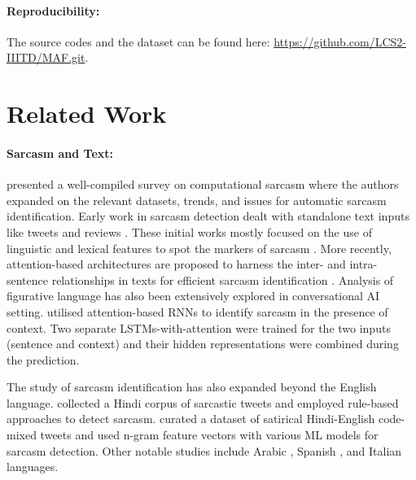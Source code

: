 \documentclass[11pt]{article}
\begin{document}
\paragraph{Reproducibility:} The source codes and the dataset can be found here: \href{https://github.com/LCS2-IIITD/MAF.git}{https://github.com/LCS2-IIITD/MAF.git}.

\section{Related Work}
\paragraph{Sarcasm and Text:}
\citet{1joshi2017automatic} presented a well-compiled survey on computational sarcasm where the authors expanded on the relevant datasets, trends, and issues for automatic sarcasm identification. Early work in sarcasm detection dealt with standalone text inputs like tweets and reviews \cite{kreuz-caucci:2007:sarcasm:lexical, tsur:sarcasm:2010, joshi:sarcsam:incongruity:2015, peled-reichart-2017-sarcasm}. These initial works mostly focused on the use of linguistic and lexical features to spot the markers of sarcasm \citep{kreuz-caucci:2007:sarcasm:lexical,tsur:sarcasm:2010}. 
More recently, attention-based architectures are  proposed to harness the inter- and intra-sentence relationships in texts for efficient sarcasm identification \citep{tay-etal-2018-reasoning, xiong2019sarcasm, srivastava-etal-2020-novel}. Analysis of figurative language has also been extensively explored in conversational AI setting. \citet{ghosh2017role} utilised attention-based RNNs to identify sarcasm in the presence of context. Two separate LSTMs-with-attention were trained for the two inputs (sentence and context) and their hidden representations were combined during the prediction.

The study of sarcasm identification has also expanded beyond the English language. \citet{bharti2017harnessing} collected a Hindi corpus of  sarcastic tweets and employed rule-based approaches to detect sarcasm. \citet{swami2018corpus} curated a dataset of  satirical Hindi-English code-mixed tweets and used n-gram feature vectors with various ML models for sarcasm detection. Other notable studies include Arabic \citep{abu-farha-magdy-2020-arabic}, Spanish \citep{ortega2019overview}, and Italian \citep{cignarella2018overview} languages.
\end{document}

